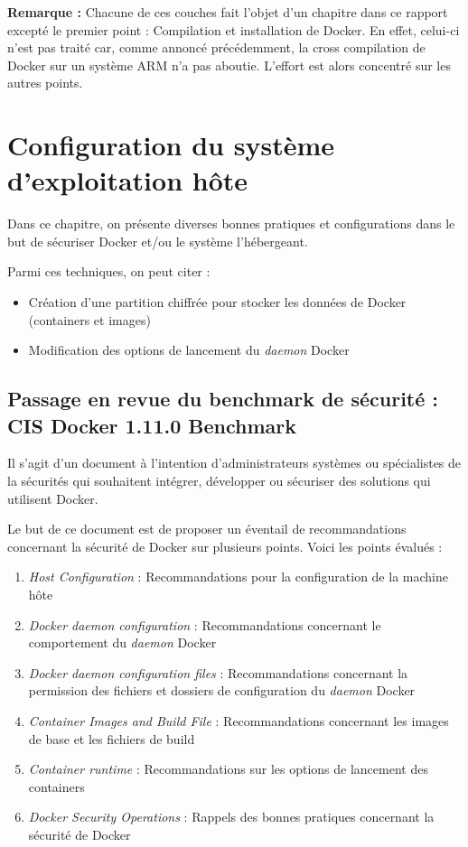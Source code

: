 \documentclass[11pt,a4paper,oneside]{report}
\begin{document}
\textbf{Remarque : } Chacune de ces couches fait l'objet d'un chapitre dans ce rapport excepté le premier point : Compilation et installation de Docker. En effet, celui-ci n'est pas traité car, comme annoncé précédemment, la cross compilation de Docker sur un système ARM n'a pas aboutie. L'effort est alors concentré sur les autres points.


\chapter{Configuration du système d'exploitation hôte}\label{config_systeme_os_hote}
Dans ce chapitre, on présente diverses bonnes pratiques et configurations dans le but de sécuriser Docker et/ou le système l'hébergeant.

Parmi ces techniques, on peut citer :

\begin{itemize}
\item Création d'une partition chiffrée pour stocker les données de Docker (containers et images)
\item Modification des options de lancement du \textit{daemon} Docker
\end{itemize}


\section{Passage en revue du benchmark de sécurité : CIS Docker 1.11.0 Benchmark}
Il s'agit d'un document à l'intention d'administrateurs systèmes ou spécialistes de la sécurités qui souhaitent intégrer, développer ou sécuriser des solutions qui utilisent Docker.

Le but de ce document est de proposer un éventail de recommandations concernant la sécurité de Docker sur plusieurs points. Voici les points évalués :
\begin{enumerate}
\item \textit{Host Configuration} : Recommandations pour la configuration de la machine hôte
\item \textit{Docker daemon configuration} : Recommandations concernant le comportement du \textit{daemon} Docker
\item \textit{Docker daemon configuration files} : Recommandations concernant la permission des fichiers et dossiers de configuration du \textit{daemon} Docker
\item \textit{Container Images and Build File} : Recommandations concernant les images de base et les fichiers de build
\item \textit{Container runtime} : Recommandations sur les options de lancement des containers
\item \textit{Docker Security Operations} : Rappels des bonnes pratiques concernant la sécurité de Docker
\end{enumerate}
\end{document}
